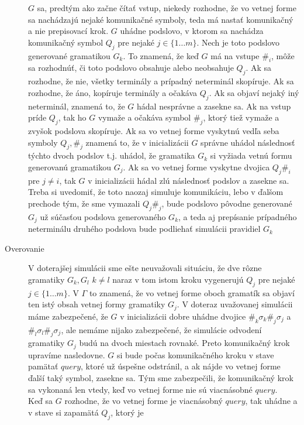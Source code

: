 \begin{dokaz}
\begin{description}
    $G$ sa, predtým ako začne čítať vstup, niekedy rozhodne, že
    vo vetnej forme sa nachádzajú nejaké komunikačné symboly, teda
    má nastať komunikačný a nie prepisovací krok. $G$ uhádne podslovo,
    v ktorom sa nachádza komunikačný symbol $Q_j$ pre nejaké $j\in\{ 1\dots
    m\}$. Nech je toto podslovo generované gramatikou $G_k$. To znamená,
    že keď $G$ má na vstupe $\#_i$, môže sa
    rozhodnúť, či toto podslovo obsahuje alebo neobsahuje $Q_j$. Ak
    sa rozhodne, že nie, všetky terminály a prípadný neterminál
    skopíruje. Ak sa rozhodne, že áno, kopíruje terminály a očakáva
    $Q_j$. Ak sa objaví nejaký iný neterminál, znamená to, že $G$
    hádal nesprávne a zasekne sa. Ak na vstup príde $Q_j$, tak ho
    $G$ vymaže a očakáva symbol $\#_j$, ktorý tiež vymaže a zvyšok podslova
    skopíruje. Ak sa vo vetnej forme vyskytnú vedľa seba symboly
    $Q_j,\#_j$ znamená to, že v inicializácii $G$ správne uhádol
    následnosť týchto dvoch podslov t.j. uhádol, že gramatika $G_k$
    si vyžiada vetnú formu generovanú gramatikou $G_j$. Ak sa vo vetnej
    forme vyskytne dvojica $Q_j\#_i$ pre $j\neq i$, tak $G$ v inicializácii hádal
    zlú následnosť podslov a zasekne sa. Treba si uvedomiť, že toto
    naozaj simuluje komunikáciu, lebo v ďalšom prechode tým, že sme vymazali
    $Q_j\#_j$, bude podslovo pôvodne generované $G_j$ už súčasťou
    podslova generovaného $G_k$, a teda aj prepísanie prípadného
    neterminálu druhého podslova bude podliehať simulácii pravidiel
    $G_k$
    \item[Overovanie]
     V doterajšej simulácii sme ešte neuvažovali situáciu, že dve rôzne
    gramatiky $G_k,G_l$ $k\neq l$ naraz v tom istom kroku vygenerujú
    $Q_j$ pre nejaké $j\in \{ 1\dots m\}$. V $\Gamma$ to znamená, že
    vo vetnej forme oboch gramatík sa objaví ten istý obsah vetnej
    formy gramatiky $G_j$. V doteraz uvažovanej simulácii máme
    zabezpečené, že $G$ v inicializácii dobre uhádne dvojice
    $\#_k\sigma_k\#_j\sigma_j$ a $\#_l\sigma_l\#_j\sigma_j$, ale
    nemáme nijako zabezpečené, že simulácie odvodení gramatiky $G_j$
    budú na dvoch miestach rovnaké. Preto komunikačný krok upravíme
    nasledovne. $G$ si bude počas komunikačného kroku v stave pamätať
    $query$, ktoré už úspešne odstránil, a ak nájde vo vetnej forme
    ďalší taký symbol, zasekne sa. Tým sme zabezpečili,
    že komunikačný krok sa vykonaná len vtedy, keď vo vetnej forme
    nie sú viacnásobné $query$.
    \\ Keď sa $G$ rozhodne, že vo vetnej forme je viacnásobný
    $query$, tak uhádne a v stave si zapamätá $Q_j$, ktorý je

\end{description}
\end{dokaz}

